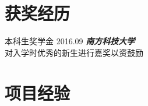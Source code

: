 \documentclass[hidelinks__VERSION__]{adamyi-cv}
\begin{document}

\section{\heir 获奖\heir 经历}

\begin{entrylist}


\entry
{\heir 本科生奖学金}
{2016.09}
{\hei \emph{\textbf{\hei 南方科技大学}}\\
对入学时优秀的新生进行嘉奖以资鼓励
}


\end{entrylist}

\pagebreak



\section{\heir 项目\heir 经验}
\end{document}
